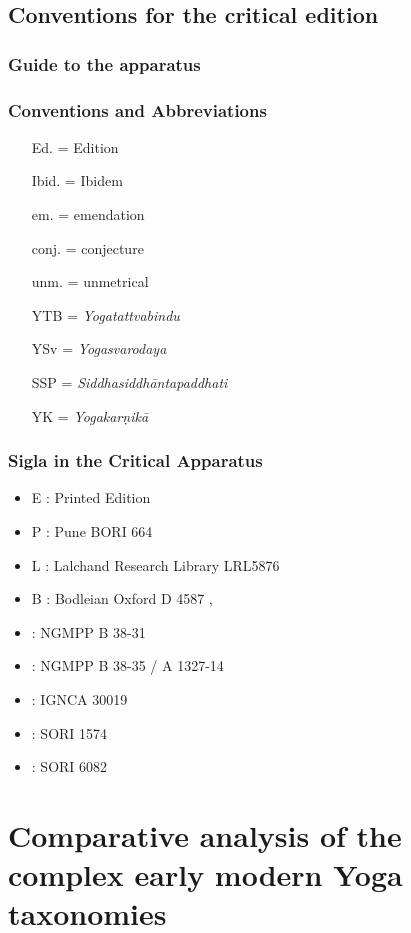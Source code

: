 \section{Conventions for the critical edition}

\subsection{Guide to the apparatus}

\subsection{Conventions and Abbreviations}
\begin{itemize}
\item[Ed.] = Edition
\item[Ibid.] = Ibidem
\item[em.] = emendation
\item[conj.] = conjecture
\item[unm.] = unmetrical
\item[YTB] = \emph{Yogatattvabindu} 
\item[YSv] = \emph{Yogasvarodaya}
\item[SSP] = \emph{Siddhasiddhāntapaddhati}
\item[YK] = \emph{Yogakarṇikā}
  
\end{itemize}

\subsection{Sigla in the Critical Apparatus}

\begin{itemize}
\item E : Printed Edition
\item P : Pune BORI 664
\item L : Lalchand Research Library LRL5876
\item B : Bodleian Oxford D 4587
‚\item \None : NGMPP B 38-31
\item \Ntwo : NGMPP B 38-35 / A 1327-14
\item \Done : IGNCA 30019
\item \Uone : SORI 1574
\item \Utwo : SORI 6082
\end{itemize}



\chapter{Comparative analysis of the complex early modern Yoga taxonomies}
\label{yogas_list}
\label{yogatax}
\clearpage

